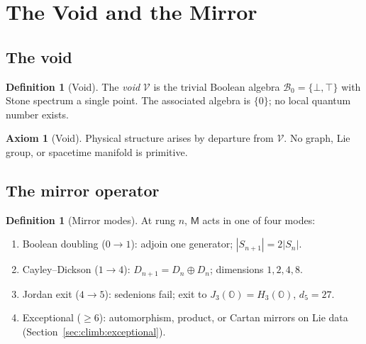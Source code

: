 \documentclass[aps,prd,onecolumn,amsmath,amssymb,nofootinbib,11pt]{revtex4-2}
\numberwithin{equation}{section}
\theoremstyle{plain}
\theoremstyle{definition}
\newtheorem{axiom}[theorem]{Axiom}
\newtheorem{definition}[theorem]{Definition}
\theoremstyle{remark}
\newcommand{\Oct}{\mathbb{O}}
\newcommand{\jalg}{J_3(\mathbb{O})}
\newcommand{\Void}{\mathcal{V}}
\newcommand{\Mirror}{\mathsf{M}}
\begin{document}
\section{The Void and the Mirror}
\label{sec:mirror}

\subsection{The void}
\label{sec:mirror:void}

\begin{definition}[Void]\label{def:void}
The \emph{void} $\Void$ is the trivial Boolean algebra
$\mathcal{B}_0=\{\bot,\top\}$ with Stone spectrum a single point. The
associated algebra is $\{0\}$; no local quantum number exists.
\end{definition}

\begin{axiom}[Void]\label{ax:void}
Physical structure arises by departure from $\Void$. No graph, Lie group, or
spacetime manifold is primitive.
\end{axiom}

\subsection{The mirror operator}
\label{sec:mirror:operator}

\begin{definition}[Mirror modes]\label{def:mirror:modes}
At rung $n$, $\Mirror$ acts in one of four modes:
\begin{enumerate}[label=\textbf{M\arabic*.},leftmargin=*]
  \item Boolean doubling ($0\to1$): adjoin one generator; $|S_{n+1}|=2|S_n|$.
  \item Cayley--Dickson ($1\to4$): $D_{n+1}=D_n\oplus D_n$; dimensions
    $1,2,4,8$.
  \item Jordan exit ($4\to5$): sedenions fail; exit to $\jalg=H_3(\Oct)$,
    $d_5=27$.
  \item Exceptional ($\geq6$): automorphism, product, or Cartan mirrors on
    Lie data (Section~\ref{sec:climb:exceptional}).
\end{enumerate}
\end{definition}
\end{document}
